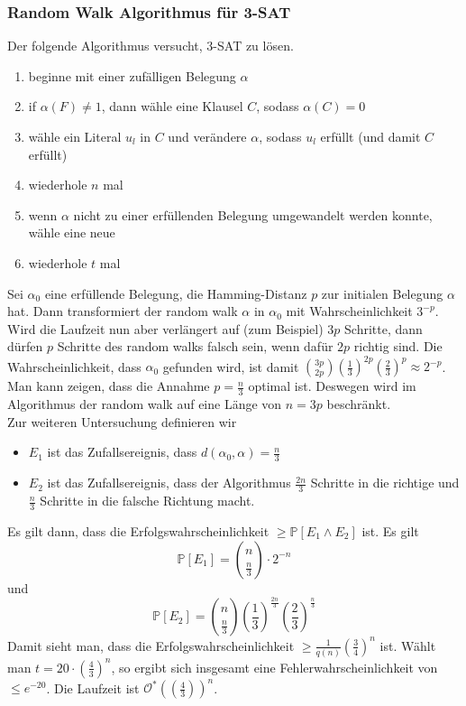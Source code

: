 \documentclass[a4paper, 12pt]{article}
\theoremstyle{plain}
\theoremstyle{definition}
\theoremstyle{lemma}
\theoremstyle{remark}
\theoremstyle{corollary}
\theoremstyle{example}
\begin{document}
	\subsubsection{Random Walk Algorithmus für 3-SAT}
	Der folgende Algorithmus versucht, 3-SAT zu lösen.
	\begin{enumerate}
		\item beginne mit einer zufälligen Belegung $\alpha$
		\item if $\alpha(F)\neq 1$, dann wähle eine Klausel $C$, sodass $\alpha(C) = 0$
		\item wähle ein Literal $u_l$ in $C$ und verändere $\alpha$, sodass $u_l$ erfüllt (und damit $C$ erfüllt)
		\item wiederhole $n$ mal
		\item wenn $\alpha$ nicht zu einer erfüllenden Belegung umgewandelt werden konnte, wähle eine neue
		\item wiederhole $t$ mal
	\end{enumerate}
	Sei $\alpha_0$ eine erfüllende Belegung, die Hamming-Distanz $p$ zur initialen Belegung $\alpha$ hat. Dann transformiert der random walk $\alpha$ in $\alpha_0$ mit Wahrscheinlichkeit $3^{-p}$. Wird die Laufzeit nun aber verlängert auf (zum Beispiel) $3p$ Schritte, dann dürfen $p$ Schritte des random walks falsch sein, wenn dafür $2p$ richtig sind. Die Wahrscheinlichkeit, dass $\alpha_0$ gefunden wird, ist damit $\binom{3p}{2p}\left(\frac{1}{3}\right)^{2p}\left(\frac{2}{3}\right)^p \approx 2^{-p}$. Man kann zeigen, dass die Annahme $p=\frac{n}{3}$ optimal ist. Deswegen wird im Algorithmus der random walk auf eine Länge von $n=3p$ beschränkt.\\
	Zur weiteren Untersuchung definieren wir
	\begin{itemize}
		\item $E_1$ ist das Zufallsereignis, dass $d(\alpha_0,\alpha) = \frac{n}{3}$
		\item $E_2$ ist das Zufallsereignis, dass der Algorithmus $\frac{2n}{3}$ Schritte in die richtige und $\frac{n}{3}$ Schritte in die falsche Richtung macht.
	\end{itemize}
	Es gilt dann, dass die Erfolgswahrscheinlichkeit $\geq \mathbb{P}[E_1\land E_2]$ ist. Es gilt \[\mathbb{P}[E_1] = \binom{n}{\frac{n}{3}}\cdot 2^{-n}\] und \[\mathbb{P}[E_2] = \binom{n}{\frac{n}{3}}\left(\frac{1}{3}\right)^{\frac{2n}{3}}\left(\frac{2}{3}\right)^\frac{n}{3}\]
	Damit sieht man, dass die Erfolgswahrscheinlichkeit $\geq \frac{1}{q(n)}\left(\frac{3}{4}\right)^n$ ist. Wählt man $t = 20\cdot \left(\frac{4}{3}\right)^n$, so ergibt sich insgesamt eine Fehlerwahrscheinlichkeit von $\leq e^{-20}$. Die Laufzeit ist $\mathcal{O}^*(\left(\frac{4}{3}\right))^n$.
\end{document}
